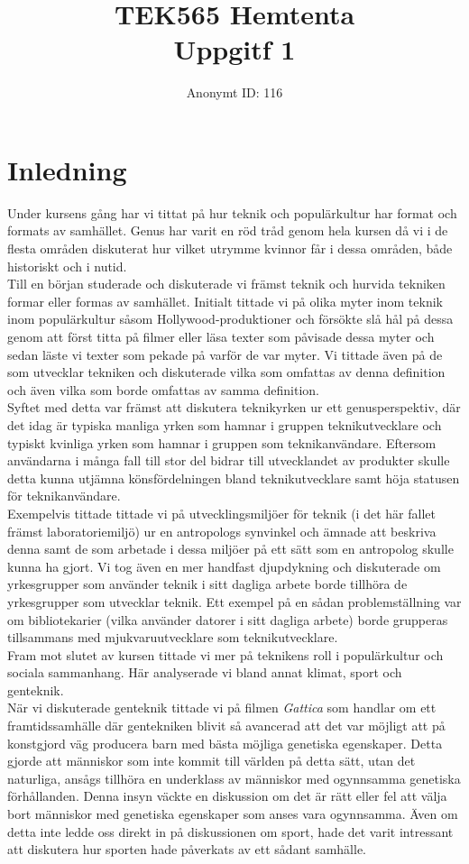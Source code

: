 \documentclass[12pt,a4paper]{article}
\title{\textbf{TEK565 Hemtenta}\\Uppgitf 1}
\author{Anonymt ID: 116}
\date{}
\begin{document}
\maketitle
\section{Inledning}
Under kursens gång har vi tittat på hur teknik och populärkultur har format och formats av samhället.
Genus har varit en röd tråd genom hela kursen då vi i de flesta områden diskuterat hur vilket utrymme kvinnor får i dessa områden, både historiskt och i nutid.\\

\noindent Till en början studerade och diskuterade vi främst teknik och hurvida tekniken formar eller formas av samhället.
Initialt tittade vi på olika myter inom teknik inom populärkultur såsom Hollywood-produktioner och försökte slå hål på dessa genom att först titta på filmer eller läsa texter som påvisade dessa myter och sedan läste vi texter som pekade på varför de var myter.
Vi tittade även på de som utvecklar tekniken och diskuterade vilka som omfattas av denna definition och även vilka som borde omfattas av samma definition.\\
Syftet med detta var främst att diskutera teknikyrken ur ett genusperspektiv, där det idag är typiska manliga yrken som hamnar i gruppen teknikutvecklare och typiskt kvinliga yrken som hamnar i gruppen som teknikanvändare.
Eftersom användarna i många fall till stor del bidrar till utvecklandet av produkter skulle detta kunna utjämna könsfördelningen bland teknikutvecklare samt höja statusen för teknikanvändare.\\
Exempelvis tittade tittade vi på utvecklingsmiljöer för teknik (i det här fallet främst laboratoriemiljö) ur en antropologs synvinkel och ämnade att beskriva denna samt de som arbetade i dessa miljöer på ett sätt som en antropolog skulle kunna ha gjort.
Vi tog även en mer handfast djupdykning och diskuterade om yrkesgrupper som använder teknik i sitt dagliga arbete borde tillhöra de yrkesgrupper som utvecklar teknik.
Ett exempel på en sådan problemställning var om bibliotekarier (vilka använder datorer i sitt dagliga arbete) borde grupperas tillsammans med mjukvaruutvecklare som teknikutvecklare.\\

\noindent Fram mot slutet av kursen tittade vi mer på teknikens roll i populärkultur och sociala sammanhang.
Här analyserade vi bland annat klimat, sport och genteknik.\\
När vi diskuterade genteknik tittade vi på filmen \textit{Gattica} som handlar om ett framtidssamhälle där gentekniken blivit så avancerad att det var möjligt att på konstgjord väg producera barn med bästa möjliga genetiska egenskaper.
Detta gjorde att människor som inte kommit till världen på detta sätt, utan det naturliga, ansågs tillhöra en underklass av människor med ogynnsamma genetiska förhållanden.
Denna insyn väckte en diskussion om det är rätt eller fel att välja bort människor med genetiska egenskaper som anses vara ogynnsamma. Även om detta inte ledde oss direkt in på diskussionen om sport, hade det varit intressant att diskutera hur sporten hade påverkats av ett sådant samhälle.
\end{document}
